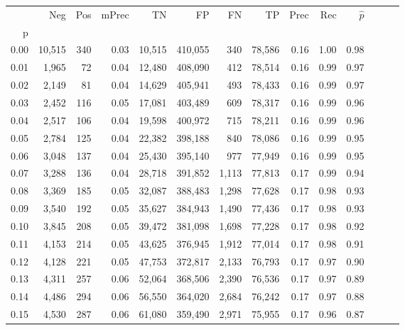 \begin{tabular}{rrrrrrrrrrrrrr}
\toprule
{} &     Neg &    Pos & mPrec &       TN &       FP &      FN &      TP &  Prec &   Rec & $\hat{p}$ \\
p    &         &        &       &          &          &         &         &       &       &           \\
\midrule
0.00 &  10,515 &    340 &  0.03 &   10,515 &  410,055 &     340 &  78,586 &  0.16 &  1.00 &      0.98 \\
0.01 &   1,965 &     72 &  0.04 &   12,480 &  408,090 &     412 &  78,514 &  0.16 &  0.99 &      0.97 \\
0.02 &   2,149 &     81 &  0.04 &   14,629 &  405,941 &     493 &  78,433 &  0.16 &  0.99 &      0.97 \\
0.03 &   2,452 &    116 &  0.05 &   17,081 &  403,489 &     609 &  78,317 &  0.16 &  0.99 &      0.96 \\
0.04 &   2,517 &    106 &  0.04 &   19,598 &  400,972 &     715 &  78,211 &  0.16 &  0.99 &      0.96 \\
0.05 &   2,784 &    125 &  0.04 &   22,382 &  398,188 &     840 &  78,086 &  0.16 &  0.99 &      0.95 \\
0.06 &   3,048 &    137 &  0.04 &   25,430 &  395,140 &     977 &  77,949 &  0.16 &  0.99 &      0.95 \\
0.07 &   3,288 &    136 &  0.04 &   28,718 &  391,852 &   1,113 &  77,813 &  0.17 &  0.99 &      0.94 \\
0.08 &   3,369 &    185 &  0.05 &   32,087 &  388,483 &   1,298 &  77,628 &  0.17 &  0.98 &      0.93 \\
0.09 &   3,540 &    192 &  0.05 &   35,627 &  384,943 &   1,490 &  77,436 &  0.17 &  0.98 &      0.93 \\
0.10 &   3,845 &    208 &  0.05 &   39,472 &  381,098 &   1,698 &  77,228 &  0.17 &  0.98 &      0.92 \\
0.11 &   4,153 &    214 &  0.05 &   43,625 &  376,945 &   1,912 &  77,014 &  0.17 &  0.98 &      0.91 \\
0.12 &   4,128 &    221 &  0.05 &   47,753 &  372,817 &   2,133 &  76,793 &  0.17 &  0.97 &      0.90 \\
0.13 &   4,311 &    257 &  0.06 &   52,064 &  368,506 &   2,390 &  76,536 &  0.17 &  0.97 &      0.89 \\
0.14 &   4,486 &    294 &  0.06 &   56,550 &  364,020 &   2,684 &  76,242 &  0.17 &  0.97 &      0.88 \\
0.15 &   4,530 &    287 &  0.06 &   61,080 &  359,490 &   2,971 &  75,955 &  0.17 &  0.96 &      0.87 \\

\end{tabular}
